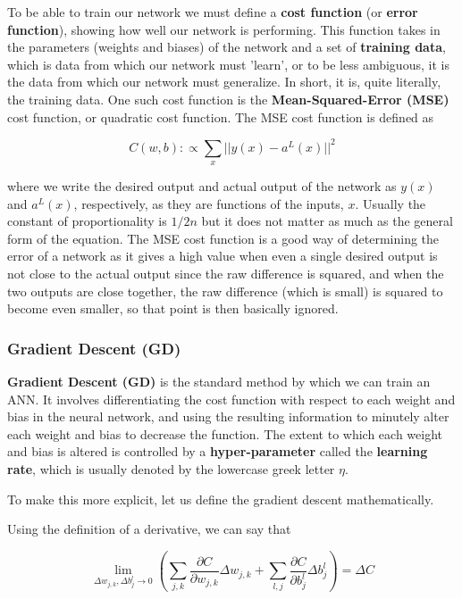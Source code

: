 \documentclass{article}
\begin{document}
To be able to train our network we must define a \textbf{cost function} (or \textbf{error function}), 
showing how well our network is performing. This function takes in the parameters (weights and biases) of the network and a set of \textbf{training data}, which is data from which our network must 'learn', or to be less ambiguous, it is the data from which our network must generalize. In short, it is, quite literally, the training data. One such cost function is the \textbf{Mean-Squared-Error (MSE)} cost
function, or quadratic cost function. The MSE cost function is defined as

\large
\begin{equation}
    C(w, b) :\propto \sum_{x}{||y(x)-a^{L}(x)||^2}
\end{equation}
\normalsize

where we write the desired output and actual output of the network as $y(x)$ and $a^{L}(x)$, respectively, as they are functions of the inputs, $x$. Usually the constant of proportionality is $1/2n$ but it does not matter as much as the general form of the equation. The MSE cost function is a good way of determining the error of a network as it gives a high value when even a single desired output is not close to the actual output since the raw difference is squared, and when the two outputs are close together, the raw difference (which is small) is squared to become even smaller, so that point is then basically ignored.

\subsubsection{Gradient Descent (GD)}

\textbf{Gradient Descent (GD)} is the standard method by which we can train an ANN. It involves differentiating the cost function with respect to each weight and bias in the neural network, and using the resulting information to minutely alter each weight and bias to decrease the function. The extent to which each weight and bias is altered is controlled by a \textbf{hyper-parameter} called the \textbf{learning rate}, which is usually denoted by the lowercase greek letter $\eta$.

To make this more explicit, let us define the gradient descent mathematically.

Using the definition of a derivative, we can say that

\large
\begin{equation}
    \lim_{\Delta w_{j, k}, \Delta b^{l}_{j} \rightarrow 0}{\left (\sum_{j, k} {\frac{\partial{C}}{\partial{w_{j, k}}} \Delta{w_{j, k}}} + \sum_{l, j}{\frac{\partial{C}}{\partial{b^{l}_{j}}} \Delta b^{l}_{j}} \right )} = \Delta C
\end{equation}
\normalsize
\end{document}
